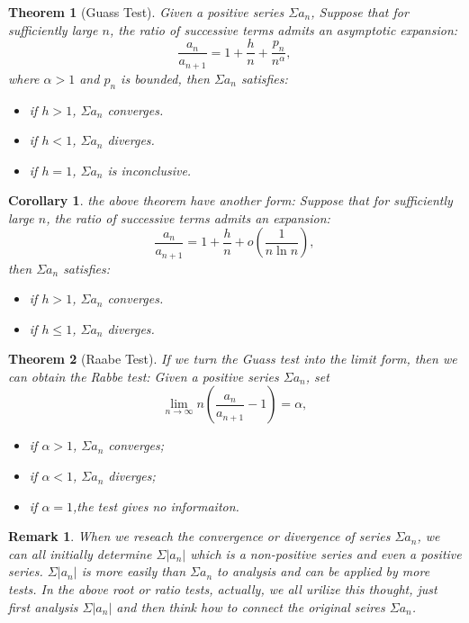 \documentclass[12pt]{article}
\theoremstyle{oneline}
\newtheorem{theorem}{Theorem}[subsection]
\newtheorem{remark}{Remark}[subsection]
\newtheorem{corollary}{Corollary}[subsection]
\theoremstyle{twoline}
\begin{document}
\begin{theorem}[Guass Test]
  Given a positive series $\Sigma a_n$, Suppose that for sufficiently large $n$, the ratio of successive terms admits an asymptotic expansion:
  \[\frac{a_n}{a_{n+1}}=1+\frac hn+\frac{p_n}{n^\alpha},\]
  where $\alpha>1$ and $p_n$ is bounded, then $\Sigma a_n$ satisfies:
  \begin{itemize}
    \item if $h>1$, $\Sigma a_n$ converges.
    \item if $h<1$, $\Sigma a_n$ diverges.
    \item if $h=1$, $\Sigma a_n$ is inconclusive.
  \end{itemize}
\end{theorem}

\begin{corollary}
the above theorem have another form: Suppose that for sufficiently large $n$, the ratio of successive terms admits an expansion:
  \[\frac{a_n}{a_{n+1}}=1+\frac hn+o(\frac1{n\ln n}),\]
  then $\Sigma a_n$ satisfies:
  \begin{itemize}
    \item if $h>1$, $\Sigma a_n$ converges.
    \item if $h\leq1$, $\Sigma a_n$ diverges.
  \end{itemize}
\end{corollary}

\begin{theorem}[Raabe Test]
  If we turn the Guass test into the limit form, then we can obtain the Rabbe test: Given a positive series $\Sigma a_n$, set
  \[\lim\limits_{n\to\infty} n(\frac{a_n}{a_{n+1}}-1)=\alpha,\]
  \begin{itemize}
    \item if $\alpha>1$, $\Sigma a_n$ converges;
    \item if $\alpha<1$, $\Sigma a_n$ diverges;
    \item if $\alpha=1$,the test gives no informaiton.
  \end{itemize}
\end{theorem}

\begin{remark}
  When we reseach the convergence or divergence of series $\Sigma a_n$, we can all initially determine $\Sigma |a_n|$ which is a non-positive series and even a positive series. $\Sigma |a_n|$ is more easily than $\Sigma a_n$ to analysis and can be applied by more tests. In the above root or ratio tests, actually, we all urilize this thought, just first analysis $\Sigma |a_n|$ and then think how to connect the original seires $\Sigma a_n$. 
\end{remark}
\end{document}
